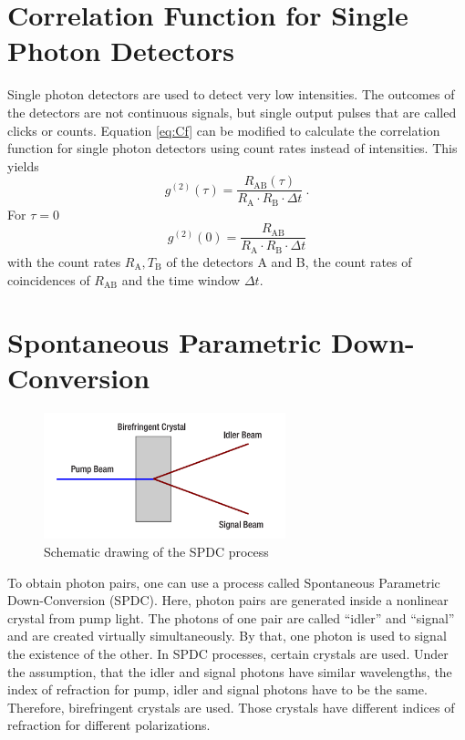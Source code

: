 \section{Correlation Function for Single Photon Detectors}
Single photon detectors are used to detect very low intensities. The outcomes of the detectors are not continuous signals, but single output pulses that are called clicks or counts. Equation \eqref{eq:Cf} can be modified to calculate the correlation function for single photon detectors using count rates instead of intensities. This yields 
\begin{equation}
    g^{(2)}(\tau)=\frac{R_\text{AB}(\tau)}{R_\text{A}\cdot R_\text{B}\cdot \Delta t}~.
\end{equation}
For $\tau=0$ 
\begin{equation}
    g^{(2)}(0)=\frac{R_\text{AB}}{R_\text{A}\cdot R_\text{B}\cdot \Delta t}
\end{equation}
with the count rates $R_\text{A}, T_\text{B}$ of the detectors A and B, the count rates of coincidences of $R_\text{AB}$ and the time window $\Delta t$.


\section{Spontaneous Parametric Down-Conversion}
\begin{figure}[H]
    \centering
    \includegraphics[width=70mm,scale=0.5]{Quantenoptik/include/crystal.PNG}
    \caption{Schematic drawing of the SPDC process} 
    \label{fig:SPDC}
\end{figure}
To obtain photon pairs, one can use a process called Spontaneous Parametric Down-Conversion (SPDC). Here, photon pairs are generated inside a nonlinear crystal from pump light. The photons of one pair are called "`idler"' and "`signal"' and are created virtually simultaneously. By that, one photon is used to signal the existence of the other. In SPDC processes, certain crystals are used. Under the assumption, that the idler and signal photons have similar wavelengths, the index of refraction for pump, idler and signal photons have to be the same. Therefore, birefringent crystals are used. Those crystals have different indices of refraction for different polarizations. 